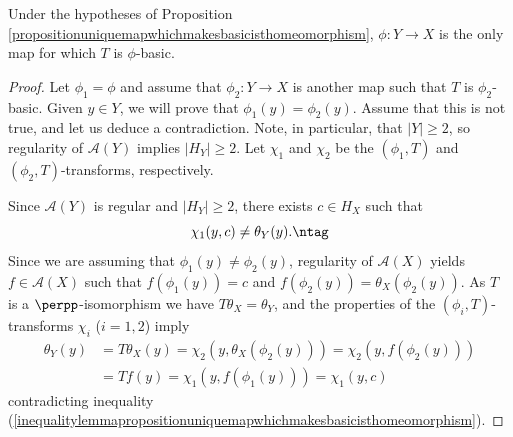 \begin{lemma}\label{lemmapropositionuniquemapwhichmakesbasicisthomeomorphism}
Under the hypotheses of Proposition \ref{propositionuniquemapwhichmakesbasicisthomeomorphism}, $\phi:Y\to X$ is the only map for which $T$ is $\phi$-basic.
\end{lemma}
\begin{proof}
Let $\phi_1=\phi$ and assume that $\phi_2:Y\to X$ is another map such that $T$ is $\phi_2$-basic. Given $y\in Y$, we will prove that $\phi_1(y)=\phi_2(y)$. Assume that this is not true, and let us deduce a contradiction. Note, in particular, that $|Y|\geq 2$, so regularity of $\mathcal{A}(Y)$ implies $|H_Y|\geq 2$. Let $\chi_1$ and $\chi_2$ be the $(\phi_1,T)$ and $(\phi_2,T)$-transforms, respectively.

Since $\mathcal{A}(Y)$ is regular and $|H_Y|\geq 2$, there exists $c\in H_X$ such that
\[\chi_1(y,c)\neq\theta_Y(y).\ntag\label{inequalitylemmapropositionuniquemapwhichmakesbasicisthomeomorphism}\]
Since we are assuming that $\phi_1(y)\neq\phi_2(y)$, regularity of $\mathcal{A}(X)$ yields $f\in\mathcal{A}(X)$ such that $f(\phi_1(y))=c$ and $f(\phi_2(y))=\theta_X(\phi_2(y))$. As $T$ is a $\perpp$-isomorphism we have $T\theta_X=\theta_Y$, and the properties of the $(\phi_i,T)$-transforms $\chi_i$ ($i=1,2$) imply
\begin{align*}
\theta_Y(y)&=T\theta_X(y)=\chi_2(y,\theta_X(\phi_2(y)))=\chi_2(y,f(\phi_2(y)))\\
&=Tf(y)=\chi_1(y,f(\phi_1(y)))=\chi_1(y,c)
\end{align*}
contradicting inequality (\ref{inequalitylemmapropositionuniquemapwhichmakesbasicisthomeomorphism}).
\end{proof}

